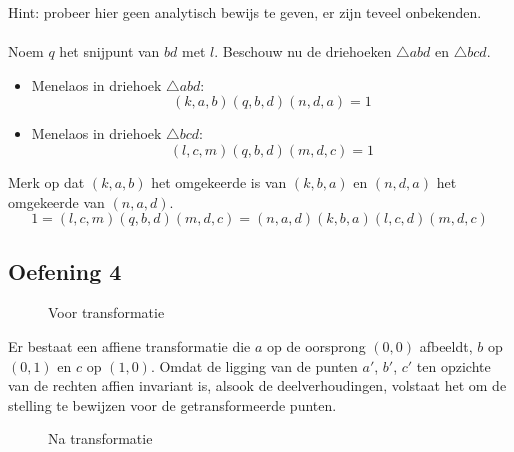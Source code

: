 \documentclass[main.tex]{subfiles}
\begin{document}
Hint: probeer hier geen analytisch bewijs te geven, er zijn teveel onbekenden.\\\\
Noem $q$ het snijpunt van $bd$ met $l$.
Beschouw nu de driehoeken $\triangle abd$ en $\triangle bcd$.
\begin{itemize}
\item Menelaos in driehoek $\triangle abd$:
  \[ (k,a,b)(q,b,d)(n,d,a) = 1 \]
\item Menelaos in driehoek $\triangle bcd$:
  \[ (l,c,m)(q,b,d)(m,d,c) = 1 \]
\end{itemize}
Merk op dat $(k,a,b)$ het omgekeerde is van $(k,b,a)$ en $(n,d,a)$ het omgekeerde van $(n,a,d)$.
\[ 1 = (l,c,m)(q,b,d)(m,d,c) = (n,a,d)(k,b,a)(l,c,d)(m,d,c) \]

\subsection*{Oefening 4}
\begin{figure}[H]
  \centering
  \caption{Voor transformatie}
\end{figure}
Er bestaat een affiene transformatie die $a$ op de oorsprong $(0,0)$ afbeeldt, $b$ op $(0,1)$ en $c$ op $(1,0)$.
Omdat de ligging van de punten $a'$, $b'$, $c'$ ten opzichte van de rechten affien invariant is, alsook de deelverhoudingen, volstaat het om de stelling te bewijzen voor de getransformeerde punten.
\begin{figure}[H]
  \centering
  \caption{Na transformatie}
\end{figure}
\end{document}
